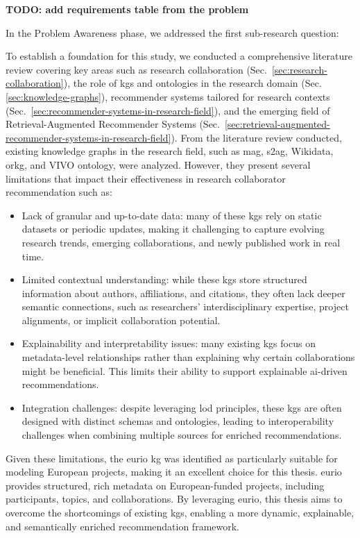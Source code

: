 \textbf{TODO: add requirements table from the problem}

In the Problem Awareness phase, we addressed the first sub-research question:
\begin{center}
    \rqOne
\end{center}
To establish a foundation for this study, we conducted a comprehensive literature review covering key areas such as research collaboration (Sec.~\ref{sec:research-collaboration}), the role of \glspl{kg} and ontologies in the research domain (Sec.\ref{sec:knowledge-graphs}), recommender systems tailored for research contexts (Sec.~\ref{sec:recommender-systems-in-research-field}), and the emerging field of Retrieval-Augmented Recommender Systems (Sec.~\ref{sec:retrieval-augmented-recommender-systems-in-research-field}).
From the literature review conducted, existing knowledge graphs in the research field, such as \gls{mag}, \gls{s2ag}, Wikidata, \gls{orkg}, and VIVO ontology, were analyzed.
However, they present several limitations that impact their effectiveness in research collaborator recommendation such as:
\begin{itemize}
    \item Lack of granular and up-to-date data: many of these \glspl{kg} rely on static datasets or periodic updates, making it challenging to capture evolving research trends, emerging collaborations, and newly published work in real time.
    \item Limited contextual understanding: while these \glspl{kg} store structured information about authors, affiliations, and citations, they often lack deeper semantic connections, such as researchers' interdisciplinary expertise, project alignments, or implicit collaboration potential.
    \item Explainability and interpretability issues: many existing \glspl{kg} focus on metadata-level relationships rather than explaining why certain collaborations might be beneficial. This limits their ability to support explainable \gls{ai}-driven recommendations.
    \item Integration challenges: despite leveraging \gls{lod} principles, these \glspl{kg} are often designed with distinct schemas and ontologies, leading to interoperability challenges when combining multiple sources for enriched recommendations.
\end{itemize}

Given these limitations, the \gls{eurio} \gls{kg} was identified as particularly suitable for modeling European projects, making it an excellent choice for this thesis.
\gls{eurio} provides structured, rich metadata on European-funded projects, including participants, topics, and collaborations.
By leveraging \gls{eurio}, this thesis aims to overcome the shortcomings of existing \glspl{kg}, enabling a more dynamic, explainable, and semantically enriched recommendation framework.

